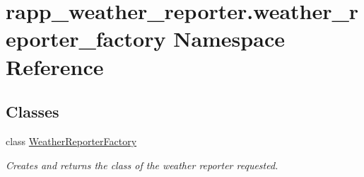 \hypertarget{namespacerapp__weather__reporter_1_1weather__reporter__factory}{\section{rapp\-\_\-weather\-\_\-reporter.\-weather\-\_\-reporter\-\_\-factory Namespace Reference}
\label{namespacerapp__weather__reporter_1_1weather__reporter__factory}
}
\subsection*{Classes}
\begin{DoxyCompactItemize}
\item 
class \hyperlink{classrapp__weather__reporter_1_1weather__reporter__factory_1_1WeatherReporterFactory}{Weather\-Reporter\-Factory}
\begin{DoxyCompactList}\small\item\em Creates and returns the class of the weather reporter requested. \end{DoxyCompactList}\end{DoxyCompactItemize}
